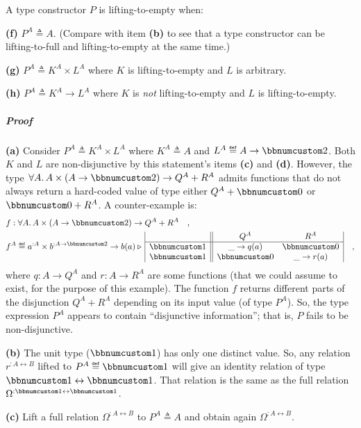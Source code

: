 A type constructor $P$ is lifting-to-empty when:

\textbf{(f)} $P^{A}\triangleq A$. (Compare with item \textbf{(b)}
to see that a type constructor can be lifting-to-full and lifting-to-empty
at the same time.)

\textbf{(g)} $P^{A}\triangleq K^{A}\times L^{A}$ where $K$ is lifting-to-empty
and $L$ is arbitrary.

\textbf{(h)} $P^{A}\triangleq K^{A}\rightarrow L^{A}$ where $K$
is \emph{not} lifting-to-empty and $L$ is lifting-to-empty.

\subparagraph{Proof}

\textbf{(a)} Consider $P^{A}\triangleq K^{A}\times L^{A}$ where $K^{A}\triangleq A$
and $L^{A}\triangleq A\rightarrow\bbnum 2$. Both $K$ and $L$ are
non-disjunctive by this statement\textsf{'}s items \textbf{(c)} and \textbf{(d)}.
However, the type $\forall A.\,A\times(A\rightarrow\bbnum 2)\rightarrow Q^{A}+R^{A}$
admits functions that do not always return a hard-coded value of type
either $Q^{A}+\bbnum 0$ or $\bbnum 0+R^{A}$. A counter-example is:
\begin{align*}
 & f:\forall A.\,A\times(A\rightarrow\bbnum 2)\rightarrow Q^{A}+R^{A}\quad,\\
 & f^{A}\triangleq a^{:A}\times b^{:A\rightarrow\bbnum 2}\rightarrow b(a)\triangleright\,\begin{array}{|c||cc|}
 & Q^{A} & R^{A}\\
\hline \bbnum 1 & \_\rightarrow q(a) & \bbnum 0\\
\bbnum 1 & \bbnum 0 & \_\rightarrow r(a)
\end{array}\quad,
\end{align*}
where $q:A\rightarrow Q^{A}$ and $r:A\rightarrow R^{A}$ are some
functions (that we could assume to exist, for the purpose of this
example). The function $f$ returns different parts of the disjunction
$Q^{A}+R^{A}$ depending on its input value (of type $P^{A}$). So,
the type expression $P^{A}$ appears to contain \textsf{``}disjunctive information\textsf{''};
that is, $P$ fails to be non-disjunctive.

\textbf{(b)} The unit type ($\bbnum 1$) has only one distinct value.
So, any relation $r^{:A\leftrightarrow B}$ lifted to $P^{A}\triangleq\bbnum 1$
will give an identity relation of type $\bbnum 1\leftrightarrow\bbnum 1$.
That relation is the same as the full relation $\Omega^{:\bbnum 1\leftrightarrow\bbnum 1}$.

\textbf{(c)} Lift a full relation $\Omega^{:A\leftrightarrow B}$
to $P^{A}\triangleq A$ and obtain again $\Omega^{:A\leftrightarrow B}$.

